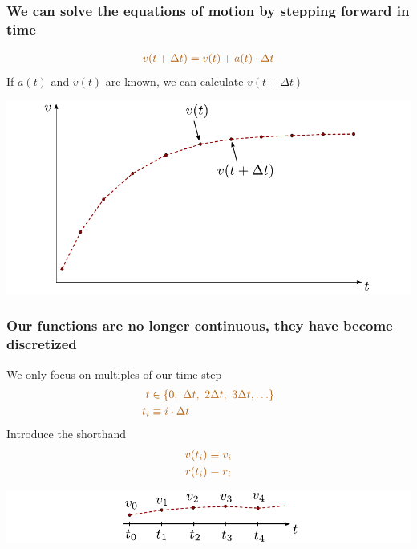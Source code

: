 \documentclass[english, 12pt]{beamer}
\newcommand{\alrt}{\color{AlertColor}}
\begin{document}
\begin{frame}[fragile]
\frametitle{We can solve the equations of motion by stepping forward in time}

\begin{align*}
\alrt v(t+\Delta t) = v(t) + a(t)\cdot \Delta t
\end{align*}
 {	
If $a(t)$ and $v(t)$ are known, we can calculate $v(t+\Delta t)$
}

 {
\vspace{-0.2cm}
\begin{center}
\includegraphics[width=\textwidth]{eulers0.pdf}
\end{center}
}
\end{frame}

\begin{frame}[fragile]
\frametitle{Our functions are no longer continuous, they have become discretized}

 {	
We only focus on multiples of our time-step
\begin{align*}
\alrt t & \alrt \in \{ 0,\ \Delta t,\  2\Delta t, \ 3\Delta t,  \ldots \} \\
\alrt t_i & \alrt \equiv i\cdot\Delta t
\end{align*}
}
 {	
Introduce the shorthand
\begin{align*}
\alrt v(t_i) &\alrt \equiv v_i \\
\alrt r(t_i) &\alrt \equiv r_i \\
\end{align*}
}

 {
 \vspace{-0.4cm}
\begin{center}
\includegraphics[width=\textwidth]{time_discretization.pdf}
\end{center}
 \vspace{0.8cm}
}
\end{frame}
\end{document}
